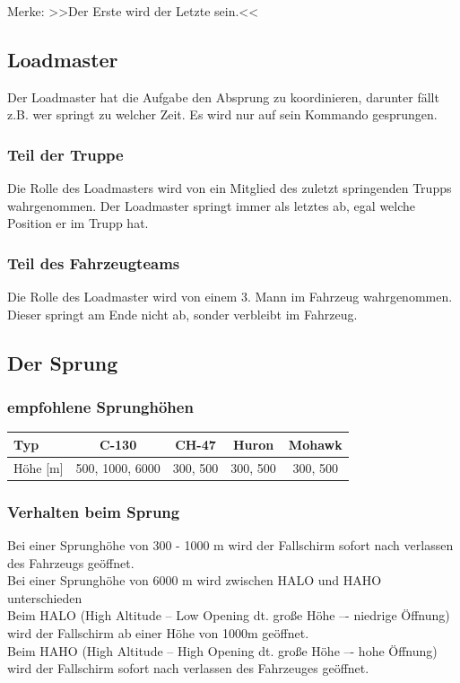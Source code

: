 	\qquad Merke: >>Der Erste wird der Letzte sein.<< 

\subsection{Loadmaster}
	Der Loadmaster hat die Aufgabe den Absprung zu koordinieren, darunter fällt z.B. wer springt zu welcher Zeit. Es wird nur auf sein Kommando gesprungen.

\subsubsection{Teil der Truppe}
	Die Rolle des Loadmasters wird von ein Mitglied des zuletzt springenden Trupps wahrgenommen. Der Loadmaster springt immer als letztes ab, egal welche Position er im Trupp hat.

\subsubsection{Teil des Fahrzeugteams}
	Die Rolle des Loadmaster wird von einem 3. Mann im Fahrzeug wahrgenommen. Dieser springt am Ende nicht ab, sonder verbleibt im Fahrzeug.

\subsection{Der Sprung}

\subsubsection{empfohlene Sprunghöhen}
\begin{longtable}{|l|c|c|c|c|}
	\hline
	Typ	&	C-130 	&	CH-47 	&	Huron	&	Mohawk	\\ 
	\hline
	Höhe [m]	&	500, 1000, 6000	& 300, 500	&	300, 500	&	300, 500 \\ 
	\hline
\end{longtable}

\subsubsection{Verhalten beim Sprung}
	Bei einer Sprunghöhe von 300 - 1000 m wird der Fallschirm sofort nach verlassen des Fahrzeugs geöffnet.\\
	Bei einer Sprunghöhe von 6000 m wird zwischen HALO und HAHO unterschieden \\
	Beim HALO (High Altitude – Low Opening dt. große Höhe –- niedrige Öffnung) wird der Fallschirm ab einer Höhe von 1000m geöffnet. \\
	Beim HAHO (High Altitude – High Opening dt. große Höhe –- hohe Öffnung) wird der Fallschirm sofort nach verlassen des Fahrzeuges geöffnet.

